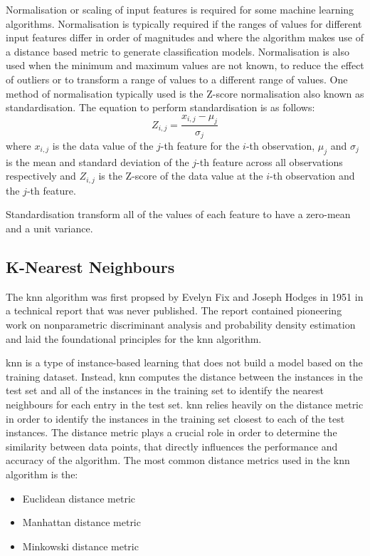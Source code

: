 \documentclass[10pt, conference]{IEEEtran}
\begin{document}
Normalisation or scaling of input features is required for some machine learning algorithms. Normalisation
is typically required if the ranges of values for different input features differ in order of magnitudes 
and where the algorithm makes use of a distance based metric to generate classification
models. Normalisation is also used when the minimum and maximum values are not known, to
reduce the effect of outliers or to transform a range of values to a different range of values. One method
of normalisation typically used is the Z-score normalisation also known as standardisation. The equation to
perform standardisation is as follows:
\begin{equation}
    Z_{i,j} = \frac{x_{i,j} - \mu_j}{\sigma_j} \label{standardisation}
\end{equation}
where $x_{i,j}$ is the data value of the $j$-th feature for the $i$-th observation, $\mu_j$ and $\sigma_j$
is the mean and standard deviation of the $j$-th feature across all observations respectively and $Z_{i,j}$
is the Z-score of the data value at the $i$-th observation and the $j$-th feature.

Standardisation transform all of the values of each feature to have a zero-mean and a unit variance.

\subsection{K-Nearest Neighbours}\label{KNN_background}

The \acrshort{knn} algorithm was first propsed by Evelyn Fix and Joseph Hodges in 1951 \cite{KNN_ref}
in a technical report that was never published. The report contained pioneering work on nonparametric
discriminant analysis and probability density estimation and laid the foundational principles for
the \acrshort{knn} algorithm.

\acrshort{knn} is a type of instance-based learning that does not build a model based on the training
dataset. Instead, \acrshort{knn} computes the distance between the instances in the test set and all
of the instances in the training set to identify the nearest neighbours for each entry in the test set.
\acrshort{knn} relies heavily on the distance metric in order to identify the instances in the training
set closest to each of the test instances. The distance metric plays a crucial role in order to determine
the similarity between data points, that directly influences the performance and accuracy of the algorithm.
The most common distance metrics used in the \acrshort{knn} algorithm is the:
\begin{itemize}
    \item Euclidean distance metric
    \item Manhattan distance metric
    \item Minkowski distance metric
\end{itemize}
\end{document}
